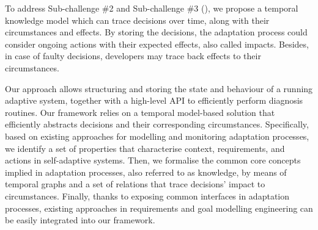 


To address Sub-challenge \#2 and Sub-challenge \#3 (\cf {}), we propose a temporal knowledge \gls{model} which can trace decisions over time, along with their circumstances and effects.
By storing the \glspl{decision}, the adaptation process could consider ongoing \glspl{action} with their expected effects, also called impacts.
Besides, in case of faulty decisions, developers may trace back effects to their \glspl{circumstance}.

Our approach allows structuring and storing the state and behaviour of a running adaptive system, together with a high-level API to efficiently perform diagnosis routines. 
Our framework relies on a temporal model-based solution that efficiently abstracts decisions and their corresponding circumstances.
Specifically, based on existing approaches for modelling and monitoring adaptation processes, we identify a set of properties that characterise context, requirements, and actions in self-adaptive systems.    
Then, we formalise the common core concepts implied in adaptation processes, also referred to as knowledge, by means of temporal graphs and a set of relations that trace decisions' impact to circumstances.
Finally, thanks to exposing common interfaces in adaptation processes, existing approaches in requirements and goal modelling engineering can be easily integrated into our framework. 

